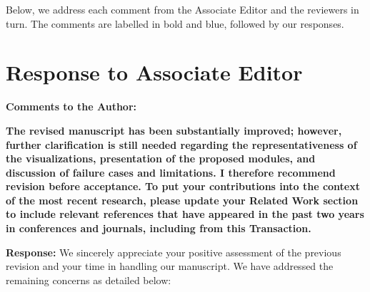 \documentclass[letterpaper,journal,onecolumn,12pt]{IEEEtran}
\begin{document}
Below, we address each comment from the Associate Editor and the reviewers in turn.
The comments are labelled in bold and blue, followed by our responses.

\clearpage

\tableofcontents
\newpage

\section{Response to Associate Editor}

{\color{BlueGreen} \textbf{Comments to the Author:}

\textbf{The revised manuscript has been substantially improved; however, further clarification is still needed
regarding the representativeness of the visualizations, presentation of the proposed modules, and discussion of
failure cases and limitations. I therefore recommend revision before acceptance.
To put your contributions into the context of the most recent research, please update your Related Work section
to include relevant references that have appeared in the past two years in conferences and journals, including
from this Transaction.}}

\textbf{Response:}
We sincerely appreciate your positive assessment of the previous revision and your time in handling our manuscript.
We have addressed the remaining concerns as detailed below:
\end{document}
